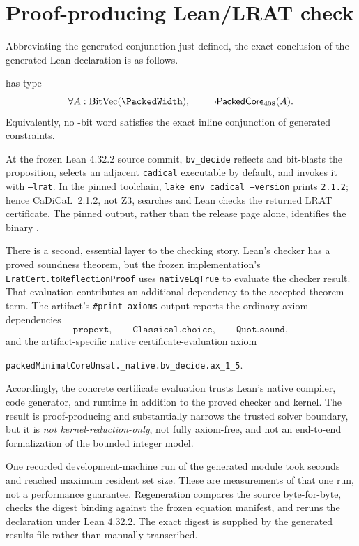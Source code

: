 \documentclass[11pt,twoside]{article}
\theoremstyle{remark}
\begin{document}
\section{Proof-producing Lean/LRAT check}
\label{sec:lean-lrat}
Abbreviating the generated conjunction just defined, the exact conclusion of
the generated Lean declaration is as follows.

\begin{tcolorbox}[colback=BoxTint,colframe=MutedTeal,title={Lean theorem:
packed core UNSAT}]
\PackedTheorem{} has type
\[
  \forall A:\operatorname{BitVec}(\PackedWidth),
  \qquad \neg\mathsf{PackedCore}_{408}(A).
\]
Equivalently, no \PackedWidth-bit word satisfies the exact inline conjunction
of \PackedConstraintCount{} generated constraints.
\end{tcolorbox}

At the frozen Lean 4.32.2 source commit, \texttt{bv\_decide} reflects and
bit-blasts the proposition, selects an adjacent \texttt{cadical} executable by
default, and invokes it with \texttt{--lrat}.  In the pinned toolchain,
\texttt{lake env cadical --version} prints \texttt{2.1.2}; hence
CaDiCaL~2.1.2, not Z3, searches and Lean checks the returned LRAT certificate.
The pinned output, rather than the release page alone, identifies the binary
\cite{leanBVDecide432,CruzFilipeEtAl2017,cadical212}.

There is a second, essential layer to the checking story.  Lean's checker has
a proved soundness theorem, but the frozen implementation's
\texttt{LratCert.toReflectionProof} uses \texttt{nativeEqTrue} to evaluate the
checker result.  That evaluation contributes an additional dependency to the
accepted theorem term.  The artifact's \texttt{\#print axioms} output reports
the ordinary axiom dependencies
\[
  \texttt{propext},\qquad
  \texttt{Classical.choice},\qquad
  \texttt{Quot.sound},
\]
and the artifact-specific native certificate-evaluation axiom
\begin{center}
  \small\nolinkurl{packedMinimalCoreUnsat._native.bv_decide.ax_1_5}.
\end{center}
Accordingly, the concrete certificate evaluation trusts Lean's native
compiler, code generator, and runtime in addition to the proved checker and
kernel.  The result is proof-producing and substantially narrows the trusted
solver boundary, but it is \emph{not kernel-reduction-only}, not fully
axiom-free, and not an end-to-end formalization of the bounded integer model.

One recorded development-machine run of the generated module took
\PackedLeanSeconds{} seconds and reached \PackedLeanMaxRSS{} maximum resident
set size.  These are measurements of that one run, not a performance
guarantee.  Regeneration compares the source byte-for-byte, checks the
digest binding against the frozen equation manifest, and reruns the
declaration under Lean 4.32.2.  The exact digest is supplied by the generated
results file rather than manually transcribed.
\end{document}
